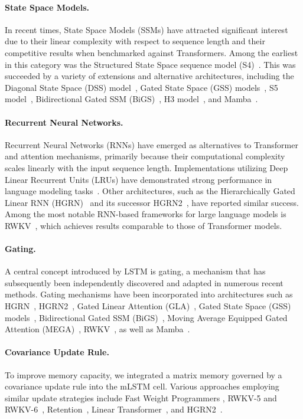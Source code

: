 \paragraph{State Space Models.} In recent times, State Space Models (SSMs) have attracted significant interest due to their linear complexity with respect to sequence length and their competitive results when benchmarked against Transformers. Among the earliest in this category was the Structured State Space sequence model (S4)~\citep{Gu:21}. This was succeeded by a variety of extensions and alternative architectures, including the Diagonal State Space (DSS) model~\citep{Gupta:22}, Gated State Space (GSS) models~\citep{Mehta:22}, S5 model~\citep{Smith:22}, Bidirectional Gated SSM (BiGS)~\citep{Wang:22}, H3 model~\citep{Fu:23}, and Mamba~\citep{Gu:24arxiv}.

\paragraph{Recurrent Neural Networks.} Recurrent Neural Networks (RNNs) have emerged as alternatives to Transformer and attention mechanisms, primarily because their computational complexity scales linearly with the input sequence length. Implementations utilizing Deep Linear Recurrent Units (LRUs) have demonstrated strong performance in language modeling tasks~\citep{Orvieto:23, De:24arxiv}. Other architectures, such as the Hierarchically Gated Linear RNN (HGRN)~\citep{Qin:23} and its successor HGRN2~\citep{Qin:24arxiv}, have reported similar success. Among the most notable RNN-based frameworks for large language models is RWKV~\citep{Peng:23arxivshort,Peng:24arxivshort}, which achieves results comparable to those of Transformer models.

\paragraph{Gating.}
A central concept introduced by LSTM is gating, a mechanism that has subsequently been independently discovered and adapted in numerous recent methods. Gating mechanisms have been incorporated into architectures such as HGRN~\citep{Qin:23}, HGRN2~\citep{Qin:24arxiv}, Gated Linear Attention (GLA)~\citep{Yang:23arxiv}, Gated State Space (GSS) models~\citep{Mehta:22}, Bidirectional Gated SSM (BiGS)~\citep{Wang:22}, Moving Average Equipped Gated Attention (MEGA)~\citep{Ma:22}, RWKV~\citep{Peng:23arxivshort}, as well as Mamba~\citep{Gu:24arxiv}.

\paragraph{Covariance Update Rule.} To improve memory capacity, we integrated a matrix memory governed by a covariance update rule into the mLSTM cell. Various approaches employing similar update strategies include Fast Weight Programmers \citep{Schmidhuber:92ncfastweights,Schlag:21}, RWKV-5 and RWKV-6~\citep{Peng:24arxivshort}, Retention~\citep{Sun:23arxiv}, Linear Transformer~\citep{Katharopoulos:20}, and HGRN2~\citep{Qin:24arxiv}.


